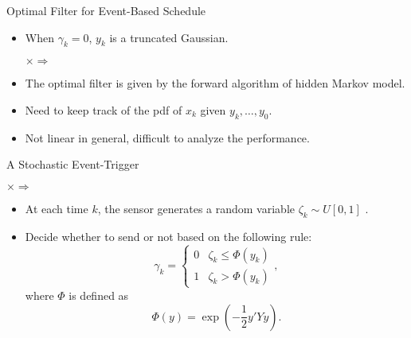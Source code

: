 \documentclass[10pt]{beamer}
\newlength\figureheight
\newlength\figurewidth
\newcommand{\tikzdir}[1]{#1.tikz}
\newcommand{\inputtikz}[1]{}}
\begin{document}
  \begin{frame}{Optimal Filter for Event-Based Schedule}

    \begin{itemize}
      \item When $\gamma_k = 0$, $y_k$ is a truncated Gaussian.
	\setlength\figureheight{2cm}
	\setlength\figurewidth{3cm}
	\begin{center}
	  \inputtikz{gaussian}$\times$\inputtikz{det}$\Rightarrow$\inputtikz{det2}
	\end{center}
      \item The optimal filter is given by the forward algorithm of hidden Markov model.
      \item Need to keep track of the pdf of $x_k$ given $y_k,\dots,y_0$.
      \item Not linear in general, difficult to analyze the performance.
    \end{itemize}
  \end{frame}

  \begin{frame}{A Stochastic Event-Trigger}
	\setlength\figureheight{2cm}
	\setlength\figurewidth{3cm}
	\begin{center}
	  \inputtikz{gaussian}$\times$\inputtikz{rand}$\Rightarrow$\inputtikz{rand2}
	\end{center}
      \begin{itemize}
	\item At each time $k$, the sensor generates a random variable $\zeta_k\sim U[0,1]$ .
	\item Decide whether to send or not based on the following rule:
	  \begin{displaymath}
	      \gamma_k= \begin{cases}
		0&\zeta_k \leq \Phi(y_k)\\
		1&\zeta_k > \Phi(y_k)
	    \end{cases},
	  \end{displaymath}
	  where $\Phi$ is defined as
	  \begin{displaymath}
	    \Phi(y) = \exp\left( -\frac{1}{2}y'Yy \right). 
	  \end{displaymath}
      \end{itemize}
  \end{frame}
\end{document}
